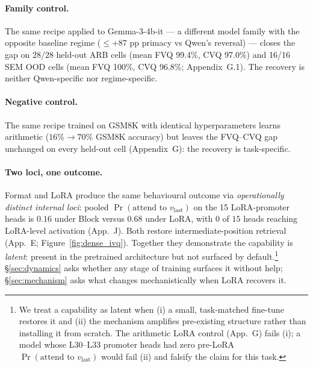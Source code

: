 \documentclass[letterpaper]{article} %
\begin{document}
\paragraph{Family control.} The same recipe applied to
Gemma-3-4b-it --- a different model family with the opposite
baseline regime ($\le {+}87$ pp primacy vs Qwen's reversal) ---
closes the gap on $28/28$ held-out ARB cells (mean FVQ 99.4\%,
CVQ 97.0\%) and 16/16 SEM OOD cells (mean FVQ 100\%,
CVQ 96.8\%; Appendix~G.1). The recovery is
neither Qwen-specific nor regime-specific.

\paragraph{Negative control.} The same recipe trained on GSM8K
with identical hyperparameters learns arithmetic
($16\% \to 70\%$ GSM8K accuracy) but leaves the FVQ--CVQ gap
unchanged on every held-out cell (Appendix~G): the
recovery is task-specific.

\paragraph{Two loci, one outcome.}
Format and LoRA produce the same behavioural outcome via
\emph{operationally distinct internal loci}: pooled
$\Pr(\text{attend to }v_{\text{last}})$ on the 15 LoRA-promoter
heads is $0.16$ under Block versus $0.68$ under LoRA, with $0$ of
$15$ heads reaching LoRA-level activation
(App.~J). Both restore intermediate-position
retrieval (App.~E;
Figure~\ref{fig:dense_ivq}). Together they demonstrate the
capability is \emph{latent}: present in the pretrained architecture
but not surfaced by default.\footnote{We treat a capability as latent when
(i) a small, task-matched fine-tune restores it and (ii) the
mechanism amplifies pre-existing structure rather than installing it
from scratch. The arithmetic LoRA control (App.~G)
fails (i); a model whose L30--L33 promoter heads had zero pre-LoRA
$\Pr(\text{attend to }v_{\text{last}})$ would fail (ii) and falsify
the claim for this task.}
\S\ref{sec:dynamics} asks whether any stage of training surfaces it
without help; \S\ref{sec:mechanism} asks what changes
mechanistically when LoRA recovers it.
\end{document}
